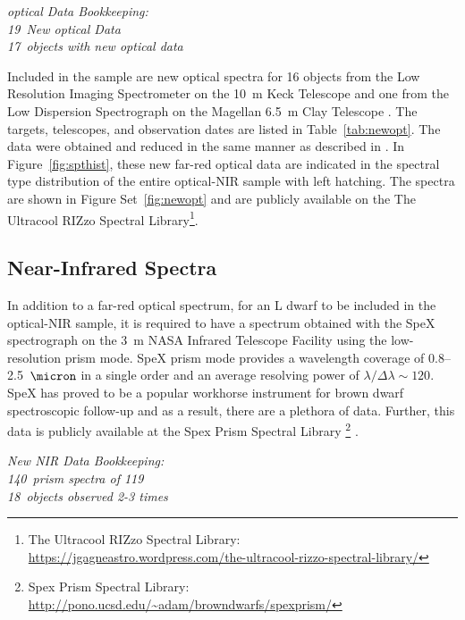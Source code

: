 \documentclass[12pt,preprint]{aastex}
\newcommand{\NewOptSpectra}{19} %
\newcommand{\NewOptObjects}{17} %
\newcommand{\NewPrismSpectra}{140} %
\newcommand{\dupes}{18} %
\newcommand{\NewPrismObjects}{119} %
\begin{document}
\label{sec:obs_new_opt}

\emph{optical Data Bookkeeping: \\
\NewOptSpectra~New optical Data\\
\NewOptObjects~objects with new optical data\\}

Included in the sample are new optical spectra for 16 objects from the Low Resolution Imaging Spectrometer on the 10~m Keck Telescope \citep[LRIS]{LRIS} and one from the Low Dispersion Spectrograph on the Magellan 6.5~m Clay Telescope \citep[LDSS-3]{LDSS2}.
The targets, telescopes, and observation dates are listed in Table~\ref{tab:newopt}. 
The data were obtained and reduced in the same manner as described in \citet{Kirkpatrick10}. 
In Figure~\ref{fig:spthist}, these new far-red optical data are indicated in the spectral type distribution of the entire optical-NIR sample with left hatching.
The spectra are shown in Figure Set~\ref{fig:newopt} and are publicly available on the The Ultracool RIZzo Spectral Library\footnote{The Ultracool RIZzo Spectral Library: \url{https://jgagneastro.wordpress.com/the-ultracool-rizzo-spectral-library/}}.

\subsection{Near-Infrared Spectra}

In addition to a far-red optical spectrum, for an L dwarf to be included in the optical-NIR sample, it is required to have a spectrum obtained with the SpeX spectrograph \citep{Spex} on the 3~m NASA Infrared Telescope Facility using the low-resolution prism mode.
SpeX prism mode provides a wavelength coverage of 0.8--2.5~$\micron$ in a single order and an average resolving power of $\lambda/\Delta\lambda\sim120$.
SpeX has proved to be a popular workhorse instrument for brown dwarf spectroscopic follow-up and as a result, there are a plethora of data. 
Further, this data is publicly available at the Spex Prism Spectral Library \footnote{Spex Prism Spectral Library: \url{http://pono.ucsd.edu/~adam/browndwarfs/spexprism/}} \citep{Burgasser:2014tr}. 

\label{sec:obs_new_nir}

\emph{New NIR Data Bookkeeping: \\
\NewPrismSpectra~prism spectra of \NewPrismObjects \\
\dupes~objects observed 2-3 times}
\end{document}

